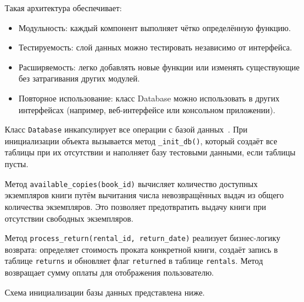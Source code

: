 \documentclass[14pt]{extreport}
\begin{document}
	Такая архитектура обеспечивает:
	\begin{itemize}
		\item Модульность: каждый компонент выполняет чётко определённую функцию.
		\item Тестируемость: слой данных можно тестировать независимо от интерфейса.
		\item Расширяемость: легко добавлять новые функции или изменять существующие без затрагивания других модулей.
		\item Повторное использование: класс Database можно использовать в других интерфейсах (например, веб-интерфейсе или консольном приложении).
	\end{itemize}

	Класс \texttt{Database} инкапсулирует все операции с базой данных~\cite{bib2}. При инициализации объекта вызывается метод \texttt{\_init\_db()}, который создаёт все таблицы при их отсутствии и наполняет базу тестовыми данными, если таблицы пусты.
	
	Метод \texttt{available\_copies(book\_id)} вычисляет количество доступных экземпляров книги путём вычитания числа невозвращённых выдач из общего количества экземпляров. Это позволяет предотвратить выдачу книги при отсутствии свободных экземпляров.
	
	Метод \texttt{process\_return(rental\_id, return\_date)} реализует бизнес-логику возврата: определяет стоимость проката конкретной книги, создаёт запись в таблице \texttt{returns} и обновляет флаг \texttt{returned} в таблице \texttt{rentals}. Метод возвращает сумму оплаты для отображения пользователю.
	
	Схема инициализации базы данных представлена ниже.
	
\end{document}
